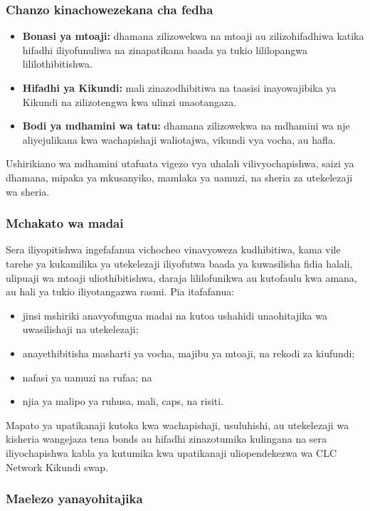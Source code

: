 \documentclass[11pt]{article}
\begin{document}
\subsubsection*{Chanzo kinachowezekana cha fedha}

\begin{itemize}[leftmargin=*]
\item \textbf{Bonasi ya mtoaji:} dhamana zilizowekwa na mtoaji au zilizohifadhiwa katika hifadhi iliyofunuliwa na zinapatikana baada ya tukio lililopangwa lililothibitishwa.
\item \textbf{Hifadhi ya Kikundi:} mali zinazodhibitiwa na taasisi inayowajibika ya Kikundi na zilizotengwa kwa ulinzi unaotangaza.
\item \textbf{Bodi ya mdhamini wa tatu:} dhamana zilizowekwa na mdhamini wa nje aliyejulikana kwa wachapishaji waliotajwa, vikundi vya vocha, au hafla.
\end{itemize}
Ushirikiano wa mdhamini utafuata vigezo vya uhalali vilivyochapishwa, saizi ya dhamana, mipaka ya mkusanyiko, mamlaka ya uamuzi, na sheria za utekelezaji wa sheria.

\subsubsection*{Mchakato wa madai}

Sera iliyopitishwa ingefafanua vichocheo vinavyoweza kudhibitiwa, kama vile tarehe ya kukamilika ya utekelezaji iliyofutwa baada ya kuwasilisha fidia halali, ulipuaji wa mtoaji uliothibitishwa, daraja lililofunikwa au kutofaulu kwa amana, au hali ya tukio iliyotangazwa rasmi. Pia itafafanua:

\begin{itemize}[leftmargin=*]
\item jinsi mshiriki anavyofungua madai na kutoa ushahidi unaohitajika wa uwasilishaji na utekelezaji;
\item anayethibitisha masharti ya vocha, majibu ya mtoaji, na rekodi za kiufundi;
\item nafasi ya uamuzi na rufaa; na
\item njia ya malipo ya ruhusa, mali, caps, na risiti.
\end{itemize}
Mapato ya upatikanaji kutoka kwa wachapishaji, usuluhishi, au utekelezaji wa kisheria wangejaza tena bonds au hifadhi zinazotumika kulingana na sera iliyochapishwa kabla ya kutumika kwa upatikanaji uliopendekezwa wa CLC Network Kikundi swap.

\subsubsection*{Maelezo yanayohitajika}
\end{document}
